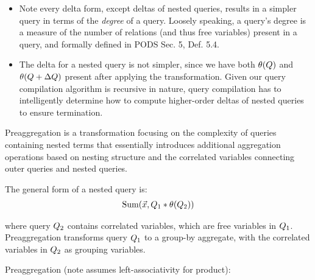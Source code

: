 \begin{itemize}
  \item Note every delta form, except deltas of nested queries, results in a
  simpler query in terms of the \textit{degree} of a query. Loosely speaking,
  a query's degree is a measure of the number of relations (and thus
  free variables) present in a query, and formally defined in PODS Sec. 5, Def.
  5.4.
  \item The delta for a nested query is not simpler, since we have both
  $\theta(Q)$ and $\theta(Q + \Delta Q)$ present after applying the
  transformation. Given our query compilation algorithm is recursive in
  nature, query compilation has to intelligently determine how to compute
  higher-order deltas of nested queries to ensure termination.
\end{itemize}

Preaggregation is a transformation focusing on the complexity of queries
containing nested terms that essentially introduces additional aggregation
operations based on nesting structure and the correlated variables connecting
outer queries and nested queries.

\comment{
\begin{align*}
\calcsum(\phi[][\vec{x}] *
(\calcsum(\ldots)[\vec{x}][] * \calceq_\phi[y][] * (\psi[y][]))) \\
\end{align*}
}


\noindent The general form of a nested query is:
\begin{align*}
\mbox{Sum}(\vec{x}, Q_1 * \theta(Q_2))
\end{align*}

\noindent where query $Q_2$ contains correlated variables, which are
free variables in $Q_1$. Preaggregation transforms query $Q_1$ to a group-by
aggregate, with the correlated variables in $Q_2$ as grouping variables.

\def \pa#1#2{\llbracket #1 \rrbracket_{PA}(#2)}

\noindent Preaggregation (note assumes left-associativity for product):

